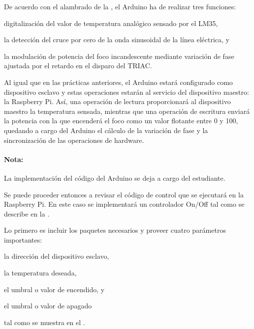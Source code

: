 De acuerdo con el alambrado de la , el Arduino ha de realizar tres funciones:
\begin{enumerate*}[label=\roman*\rpar]
	\item digitalización del valor de temperatura analógico sensado por el LM35,
	\item la detección del cruce por cero de la onda sinusoidal de la línea eléctrica,
	y
	\item la modulación de potencia del foco incandescente mediante variación de fase ajustada por el retardo en el disparo del TRIAC.
\end{enumerate*}
Al igual que en las prácticas anteriores, el Arduino estará configurado como dispositivo esclavo y estas operaciones estarán al servicio del dispositivo maestro: la Raspberry Pi.
Así, una operación de lectura proporcionará al dispositivo maestro la temperatura sensada, mientras que una operación de escritura enviará la potencia con la que encenderá el foco como un valor flotante entre 0 y 100, quedando a cargo del Arduino el cálculo de la variación de fase y la sincronización de las operaciones de hardware.

\paragraph{Nota:} La implementación del código del Arduino se deja a cargo del estudiante.

\medskip

Se puede proceder entonces a revisar el código de control que se ejecutará en la Raspberry Pi.
En este caso se implementará un controlador On/Off tal como se describe en la .

Lo primero es incluir los paquetes necesarios y proveer cuatro parámetros importantes:
\begin{enumerate*}[label=\arabic*\rpar]
	\item la dirección del dispositivo esclavo,
	\item la temperatura deseada,
	\item el umbral o valor de encendido,
	y
	\item el umbral o valor de apagado
\end{enumerate*}
tal como se muestra en el .

\begin{minipage}{\linewidth}%

\end{minipage}

